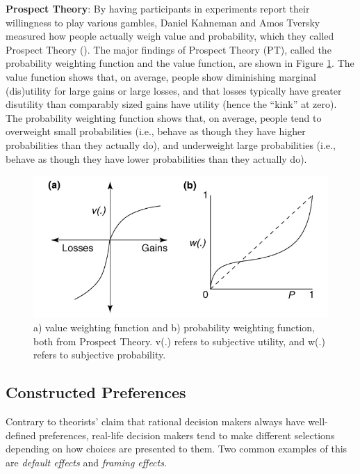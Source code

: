 \documentclass[
]{krantz}
\begin{document}
\textbf{Prospect Theory}: By having participants in experiments report their willingness to play various gambles, Daniel Kahneman and Amos Tversky measured how people actually weigh value and probability, which they called Prospect Theory (). The major findings of Prospect Theory (PT), called the probability weighting function and the value function, are shown in Figure \ref{fig:prospect}. The value function shows that, on average, people show diminishing marginal (dis)utility for large gains or large losses, and that losses typically have greater disutility than comparably sized gains have utility (hence the ``kink'' at zero). The probability weighting function shows that, on average, people tend to overweight small probabilities (i.e., behave as though they have higher probabilities than they actually do), and underweight large probabilities (i.e., behave as though they have lower probabilities than they actually do).

\begin{figure}

{\centering \includegraphics[width=0.6\linewidth]{images/ch9/fig7} 

}

\caption{a) value weighting function and b) probability weighting function, both from Prospect Theory. v(.) refers to subjective utility, and w(.) refers to subjective probability.}\label{fig:prospect}
\end{figure}

\subsection*{Constructed Preferences}\label{constructed-preferences}


Contrary to theorists' claim that rational decision makers always have well-defined preferences, real-life decision makers tend to make different selections depending on how choices are presented to them. Two common examples of this are \emph{default effects} and \emph{framing effects}.
\end{document}
